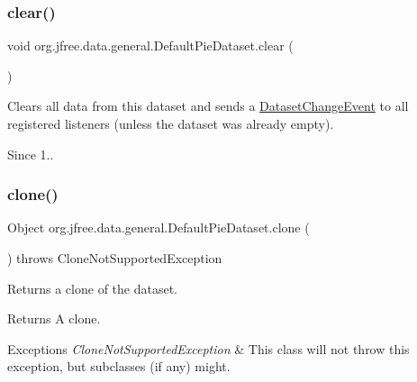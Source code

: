 \subsubsection{\texorpdfstring{clear()}{clear()}}
{\footnotesize\ttfamily void org.\+jfree.\+data.\+general.\+Default\+Pie\+Dataset.\+clear (\begin{DoxyParamCaption}{ }\end{DoxyParamCaption})}

Clears all data from this dataset and sends a \mbox{\hyperlink{classorg_1_1jfree_1_1data_1_1general_1_1_dataset_change_event}{Dataset\+Change\+Event}} to all registered listeners (unless the dataset was already empty).

\begin{DoxySince}{Since}
1.. 
\end{DoxySince}
\mbox{\label{classorg_1_1jfree_1_1data_1_1general_1_1_default_pie_dataset_a28025005e529e0b2c3342d1abc0e8dea}} 
\subsubsection{\texorpdfstring{clone()}{clone()}}
{\footnotesize\ttfamily Object org.\+jfree.\+data.\+general.\+Default\+Pie\+Dataset.\+clone (\begin{DoxyParamCaption}{ }\end{DoxyParamCaption}) throws Clone\+Not\+Supported\+Exception}

Returns a clone of the dataset.

\begin{DoxyReturn}{Returns}
A clone.
\end{DoxyReturn}

\begin{DoxyExceptions}{Exceptions}
{\em Clone\+Not\+Supported\+Exception} & This class will not throw this exception, but subclasses (if any) might. \\
\hline
\end{DoxyExceptions}
\mbox{\label{classorg_1_1jfree_1_1data_1_1general_1_1_default_pie_dataset_af8f24625ba8168f9a73016184858de9d}} 
